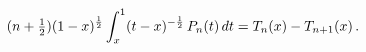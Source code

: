\[(n+\tfrac{1}{2})(1-x)^{\frac{1}{2}}\int_{x}^{1}(t-x)^{-\frac{1}{2}}\mathop{P_{%
n}\/}\nolimits\!\left(t\right)dt=\mathop{T_{n}\/}\nolimits\!\left(x\right)-%
\mathop{T_{n+1}\/}\nolimits\!\left(x\right).\]